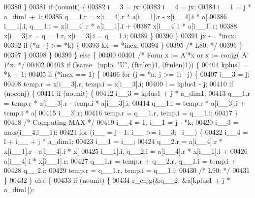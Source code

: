 \begin{DoxyCode}
00380             \}
00381             \textcolor{keywordflow}{if} (nounit) \{
00382                 i\_\_3 = jx;
00383                 i\_\_4 = jx;
00384                 i\_\_1 = j * a\_dim1 + 1;
00385                 q\_\_1.r = x[i\_\_4].r * a[i\_\_1].r - x[i\_\_4].i * a[
00386                     i\_\_1].i, q\_\_1.i = x[i\_\_4].r * a[i\_\_1].i + 
00387                     x[i\_\_4].i * a[i\_\_1].r;
00388                 x[i\_\_3].r = q\_\_1.r, x[i\_\_3].i = q\_\_1.i;
00389             \}
00390             \}
00391             jx -= *incx;
00392             \textcolor{keywordflow}{if} (*n - j >= *k) \{
00393             kx -= *incx;
00394             \}
00395 \textcolor{comment}{/* L80: */}
00396         \}
00397         \}
00398     \}
00399     \} \textcolor{keywordflow}{else} \{
00400 
00401 \textcolor{comment}{/*        Form  x := A'*x  or  x := conjg( A' )*x. */}
00402 
00403     \textcolor{keywordflow}{if} (lsame\_(uplo, \textcolor{stringliteral}{"U"}, (ftnlen)1, (ftnlen)1)) \{
00404         kplus1 = *k + 1;
00405         \textcolor{keywordflow}{if} (*incx == 1) \{
00406         \textcolor{keywordflow}{for} (j = *n; j >= 1; --j) \{
00407             i\_\_3 = j;
00408             temp.r = x[i\_\_3].r, temp.i = x[i\_\_3].i;
00409             l = kplus1 - j;
00410             \textcolor{keywordflow}{if} (noconj) \{
00411             \textcolor{keywordflow}{if} (nounit) \{
00412                 i\_\_3 = kplus1 + j * a\_dim1;
00413                 q\_\_1.r = temp.r * a[i\_\_3].r - temp.i * a[i\_\_3].i, 
00414                     q\_\_1.i = temp.r * a[i\_\_3].i + temp.i * a[
00415                     i\_\_3].r;
00416                 temp.r = q\_\_1.r, temp.i = q\_\_1.i;
00417             \}
00418 \textcolor{comment}{/* Computing MAX */}
00419             i\_\_4 = 1, i\_\_1 = j - *k;
00420             i\_\_3 = max(i\_\_4,i\_\_1);
00421             \textcolor{keywordflow}{for} (i\_\_ = j - 1; i\_\_ >= i\_\_3; --i\_\_) \{
00422                 i\_\_4 = l + i\_\_ + j * a\_dim1;
00423                 i\_\_1 = i\_\_;
00424                 q\_\_2.r = a[i\_\_4].r * x[i\_\_1].r - a[i\_\_4].i * x[
00425                     i\_\_1].i, q\_\_2.i = a[i\_\_4].r * x[i\_\_1].i + 
00426                     a[i\_\_4].i * x[i\_\_1].r;
00427                 q\_\_1.r = temp.r + q\_\_2.r, q\_\_1.i = temp.i + 
00428                     q\_\_2.i;
00429                 temp.r = q\_\_1.r, temp.i = q\_\_1.i;
00430 \textcolor{comment}{/* L90: */}
00431             \}
00432             \} \textcolor{keywordflow}{else} \{
00433             \textcolor{keywordflow}{if} (nounit) \{
00434                 r\_cnjg(&q\_\_2, &a[kplus1 + j * a\_dim1]);

\end{DoxyCode}
